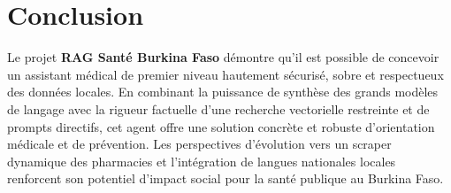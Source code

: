\documentclass[12pt,a4paper]{article}
\begin{document}
\section{Conclusion}
Le projet \textbf{RAG Santé Burkina Faso} démontre qu'il est possible de concevoir un assistant médical de premier niveau hautement sécurisé, sobre et respectueux des données locales. En combinant la puissance de synthèse des grands modèles de langage avec la rigueur factuelle d'une recherche vectorielle restreinte et de prompts directifs, cet agent offre une solution concrète et robuste d'orientation médicale et de prévention. Les perspectives d'évolution vers un scraper dynamique des pharmacies et l'intégration de langues nationales locales renforcent son potentiel d'impact social pour la santé publique au Burkina Faso.
\end{document}
